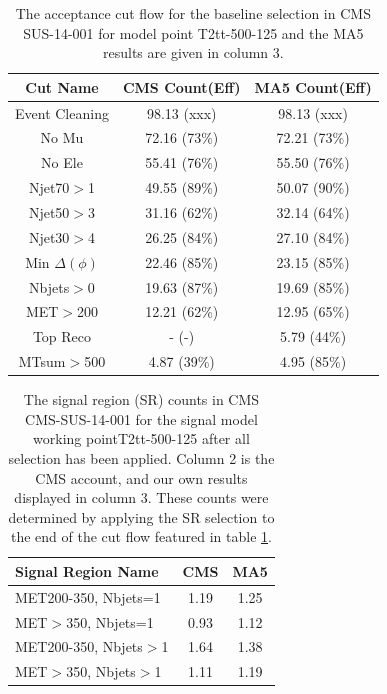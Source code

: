 \begin{table}
    \begin{centering}
    \begin{tabular}{  c | c | c  }
    \hline
    Cut Name & CMS Count(Eff) & MA5 Count(Eff)\\
    \hline
        Event Cleaning & 98.13 (xxx) & 98.13 (xxx)\\
    No Mu & 72.16 (73\%) & 72.21 (73\%)\\
    No Ele & 55.41 (76\%) & 55.50 (76\%)\\
    Njet70$>$1 & 49.55 (89\%) & 50.07 (90\%)\\
    Njet50$>$3 & 31.16 (62\%) & 32.14 (64\%)\\
    Njet30$>$4 & 26.25 (84\%) & 27.10 (84\%)\\
    Min $\Delta(\phi)$ & 22.46 (85\%) & 23.15 (85\%)\\
    Nbjets$>$0 & 19.63 (87\%) & 19.69 (85\%)\\
    MET$>$200 & 12.21 (62\%) & 12.95 (65\%)\\
    Top Reco & - (-) & 5.79 (44\%)\\
    MTsum$>$500 & 4.87 (39\%) & 4.95 (85\%)\\
\hline
    \end{tabular}
    \caption{The acceptance cut flow for the baseline selection in CMS SUS-14-001 for
    model point T2tt-500-125 and the MA5 results are given in column 3.}
    \label{table:T2tt-500-125}
    \end{centering}
    \end{table}

    \begin{table}
    \begin{centering}
    \begin{tabular}{  l | c | c  }
    \hline
    Signal Region Name & CMS & MA5\\
    \hline
    MET200-350,  Nbjets=1 & 1.19 & 1.25\\ 
 \hline 
MET$>$350,  Nbjets=1 & 0.93 & 1.12\\ 
 \hline 
MET200-350,  Nbjets$>$1 & 1.64 & 1.38\\ 
 \hline 
MET$>$350,  Nbjets$>$1 & 1.11 & 1.19\\ 
 \hline 
\hline
    \end{tabular}
    \caption{The signal region (SR) counts in CMS CMS-SUS-14-001 for
    the signal model working pointT2tt-500-125 after all selection has been applied. Column 2 is the CMS account,
    and our own results displayed in column 3. These counts were determined by applying the SR selection to the end of the cut flow featured in table \ref{table:T2tt-500-125}.}
    \end{centering}
    \end{table}



